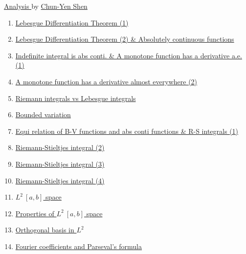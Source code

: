 \documentclass[11pt]{article}
\begin{document}
\begin{center}
	\large {\href{https://www.youtube.com/playlist?list=PLVJXJebpO4PhfoJl9LEuiI30P1JxvLEga}{Analysis }} by \href{https://sites.google.com/site/shencmath/}{Chun-Yen Shen}
\end{center}

\vspace{-0.5cm}

\begin{enumerate}
	\item	\href{https://mp.weixin.qq.com/s/OIaI3hbwGIUX3Y4e_EROOQ}{Lebesgue Differentiation Theorem (1)}	%
	\item	\href{https://mp.weixin.qq.com/s/drRat8Slew_KFj4Yq6x4JQ}{Lebesgue Differentiation Theorem (2) \& Absolutely continuous functions}	%
	\item	\href{https://mp.weixin.qq.com/s/9YEo-duMYyul3cUzaR-lrA}{Indefinite integral is abs conti. \& A monotone function has a derivative a.e. (1)} 	%
	\item 	\href{https://mp.weixin.qq.com/s/EjT8UKkCGNCbfiaZ1q8Y-w}{A monotone function has a derivative almost everywhere (2)}	%
	\item 	\href{https://mp.weixin.qq.com/s/9lX2gYoJxq8EKLONRnA4yA}{Riemann integrals vs Lebesgue integrals}	%
	\item 	\href{https://mp.weixin.qq.com/s/CMcL5vHqYH6aCJAXlEXDTg}{Bounded variation}	%
	\item 	\href{https://mp.weixin.qq.com/s/41Wz5ruEkfFlmV0KKtpamQ}{Equi relation of B-V functions and abs conti functions \& R-S integrals (1)}	%
	\item 	\href{https://mp.weixin.qq.com/s/Yf_pbXgA5ECfUt3Dr5QTcQ}{Riemann-Stieltjes integral (2)}	%
	\item 	\href{https://mp.weixin.qq.com/s/rqe5FeAjRmbjgZco_anx9g}{Riemann-Stieltjes integral (3)}	%
	\item 	\href{https://mp.weixin.qq.com/s/Qs7EPDpJZEbDnO5Urt_yig}{Riemann-Stieltjes integral (4)}	%
	\item	\href{https://mp.weixin.qq.com/s/loTF6azJc-z9owY5Bl_8RQ}{$L^2 \ [a,b]$ space}	%
	\item	\href{https://mp.weixin.qq.com/s/cs-zNCfw5_Y1NbCyS7wcMw}{Properties of $L^2 \ [a,b]$ space}	%
	\item	\href{https://mp.weixin.qq.com/s/GMPk8UOz4I_GiYxk8TAe7A}{Orthogonal basis in $L^2$} 	%
	\item 	\href{https://mp.weixin.qq.com/s/Zah3Ki2Psq0qEMq2QVGBmw}{Fourier coefficients and Parseval's formula}	%

\end{enumerate}
\end{document}
